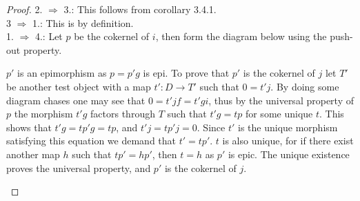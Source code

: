 \begin{proof}
        2. $\Rightarrow$ 3.: This follows from corollary 3.4.1. \\
        
        3 $\Rightarrow$ 1.: This is by definition. \\

        1. $\Rightarrow$ 4.: Let $p$ be the cokernel of $i$, then form the diagram below using the push-out property.
        \begin{center}
        \end{center}
        $p'$ is an epimorphism as $p=p'g$ is epi. To prove that $p'$ is the cokernel of $j$ let $T'$ be another test object with a map $t':D\rightarrow T'$ such that $0 = t'j$. By doing some diagram chases one may see that $0=t'jf=t'gi$, thus by the universal property of $p$ the morphism $t'g$ factors through $T$ such that $t'g=tp$ for some unique $t$. This shows that $t'g=tp'g=tp$, and $t'j=tp'j=0$. Since $t'$ is the unique morphism satisfying this equation we demand that $t'=tp'$. $t$ is also unique, for if there exist another map $h$ such that $tp'=hp'$, then $t=h$ as $p'$ is epic. The unique existence proves the universal property, and $p'$ is the cokernel of $j$.
        \begin{center}
        \end{center} 
 

\end{proof}

